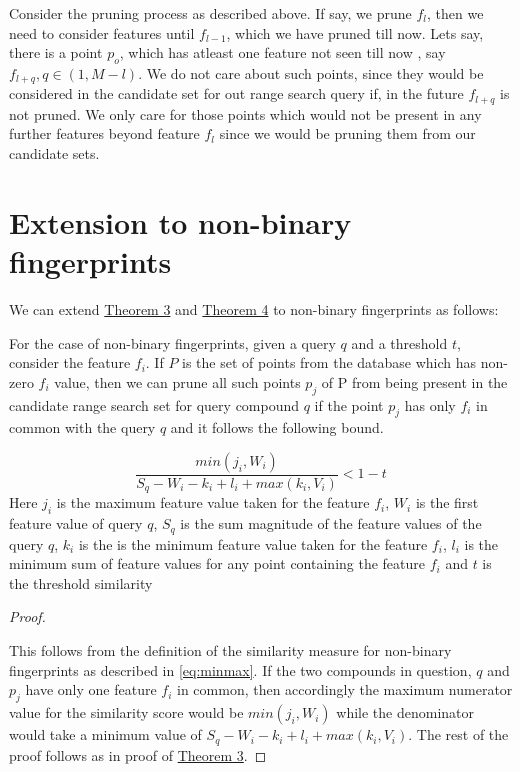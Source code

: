 Consider the pruning process as described above. If say, we prune $f_l$, then we need to consider features until $f_{l-1}$, which we have pruned till now. Lets say, there is a point $p_o$, which has atleast one feature not seen till now , say $f_{l+q}, q\in(1,M-l)$. We do not care about such points, since they would be considered in the candidate set for out range search query if, in the future $f_{l+q}$ is not pruned. We only care for those points which would not be present in any further features beyond feature $f_l$ since we would be pruning them from our candidate sets. 

\section{Extension to non-binary fingerprints}	
\label{sec:prune2}

We can extend \hyperref[thm1bound]{Theorem 3} and \hyperref[thm2bound]{Theorem 4} to non-binary fingerprints as follows:



\begin{thm}
\label{thm3bound}
For the case of non-binary fingerprints, given a query $q$ and a threshold $t$, consider the feature $f_i$. If $P$ is the set of points from the database which has non-zero $f_i$ value, then we can prune all such points $p_j$ of P from being present in the candidate range search set for query compound $q$ if the point $p_j$ has only $f_i$ in common with the query $q$ and it follows the following bound. 

\begin{equation}
\label{eq:boun3}
\frac{min(j_i,W_i)}{S_q - W_i -k_i+ l_i + max (k_i, V_i)}  < 1-t
\end{equation}
Here $j_i$ is the maximum feature value taken for the feature $f_i$,  $W_i$ is the first feature value of query $q$,  $S_q$ is the sum magnitude of the feature values of the query $q$,  $k_i$ is the is the minimum feature value taken for the feature $f_i$,  $l_i$ is the minimum sum of feature values for any point containing the feature $f_i$ and $t$ is the threshold similarity


\end{thm}


\begin{proof}
\label{proof3}

This follows from the definition of the similarity measure for non-binary fingerprints as described in \autoref{eq:minmax}. If the two compounds in question, $q$  and $p_j$ have only one feature $f_i$ in common, then accordingly the maximum numerator value for the similarity score would be $min(j_i,W_i)$ while the denominator would take a minimum value of $S_q - W_i -k_i+ l_i + max (k_i, V_i)$. The rest of the proof follows as in proof of \hyperref[thm1bound]{Theorem 3}.

\end{proof}



